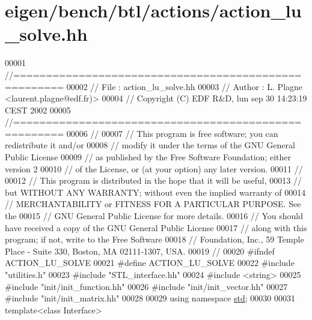 \hypertarget{eigen_2bench_2btl_2actions_2action__lu__solve_8hh_source}{}\section{eigen/bench/btl/actions/action\+\_\+lu\+\_\+solve.hh}
\label{eigen_2bench_2btl_2actions_2action__lu__solve_8hh_source}

\begin{DoxyCode}
00001 \textcolor{comment}{//=====================================================}
00002 \textcolor{comment}{// File   :  action\_lu\_solve.hh}
00003 \textcolor{comment}{// Author :  L. Plagne <laurent.plagne@edf.fr)>        }
00004 \textcolor{comment}{// Copyright (C) EDF R&D,  lun sep 30 14:23:19 CEST 2002}
00005 \textcolor{comment}{//=====================================================}
00006 \textcolor{comment}{// }
00007 \textcolor{comment}{// This program is free software; you can redistribute it and/or}
00008 \textcolor{comment}{// modify it under the terms of the GNU General Public License}
00009 \textcolor{comment}{// as published by the Free Software Foundation; either version 2}
00010 \textcolor{comment}{// of the License, or (at your option) any later version.}
00011 \textcolor{comment}{// }
00012 \textcolor{comment}{// This program is distributed in the hope that it will be useful,}
00013 \textcolor{comment}{// but WITHOUT ANY WARRANTY; without even the implied warranty of}
00014 \textcolor{comment}{// MERCHANTABILITY or FITNESS FOR A PARTICULAR PURPOSE.  See the}
00015 \textcolor{comment}{// GNU General Public License for more details.}
00016 \textcolor{comment}{// You should have received a copy of the GNU General Public License}
00017 \textcolor{comment}{// along with this program; if not, write to the Free Software}
00018 \textcolor{comment}{// Foundation, Inc., 59 Temple Place - Suite 330, Boston, MA  02111-1307, USA.}
00019 \textcolor{comment}{// }
00020 \textcolor{preprocessor}{#ifndef ACTION\_LU\_SOLVE}
00021 \textcolor{preprocessor}{#define ACTION\_LU\_SOLVE}
00022 \textcolor{preprocessor}{#include "utilities.h"}
00023 \textcolor{preprocessor}{#include "STL\_interface.hh"}
00024 \textcolor{preprocessor}{#include <string>}
00025 \textcolor{preprocessor}{#include "init/init\_function.hh"}
00026 \textcolor{preprocessor}{#include "init/init\_vector.hh"}
00027 \textcolor{preprocessor}{#include "init/init\_matrix.hh"}
00028 
00029 \textcolor{keyword}{using namespace }\hyperlink{namespacestd}{std};
00030 
00031 \textcolor{keyword}{template}<\textcolor{keyword}{class} Interface>

\end{DoxyCode}
